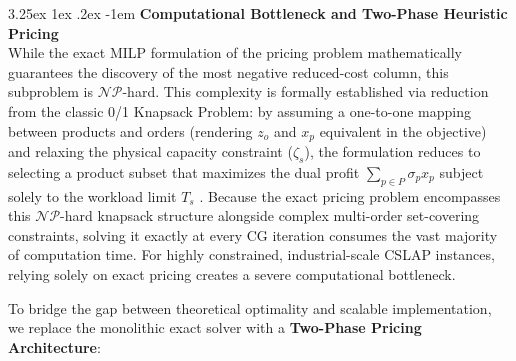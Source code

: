 \documentclass[preprint,review,11pt,authoryear]{elsarticle}
\makeatletter
\renewcommand\paragraph{\@startsection{paragraph}{4}{\z@}
  {3.25ex \@plus1ex \@minus.2ex}
  {-1em}
  {\normalfont\normalsize\itshape}}
\makeatother
\begin{document}
\paragraph{\textbf{Computational Bottleneck and Two-Phase Heuristic Pricing \\}}
\label{sec:cg_enhancements}
While the exact MILP formulation of the pricing problem mathematically guarantees the discovery of the most negative reduced-cost column, this subproblem is $\mathcal{N}\mathcal{P}$-hard. This complexity is formally established via reduction from the classic 0/1 Knapsack Problem: by assuming a one-to-one mapping between products and orders (rendering $z_o$ and $x_p$ equivalent in the objective) and relaxing the physical capacity constraint ($\zeta_s$), the formulation reduces to selecting a product subset that maximizes the dual profit $\sum_{p \in P} \sigma_{p} x_p$ subject solely to the workload limit $T_s$ \citep{garey1979computers}. Because the exact pricing problem encompasses this $\mathcal{N}\mathcal{P}$-hard knapsack structure alongside complex multi-order set-covering constraints, solving it exactly at every CG iteration consumes the vast majority of computation time. For highly constrained, industrial-scale CSLAP instances, relying solely on exact pricing creates a severe computational bottleneck.

To bridge the gap between theoretical optimality and scalable implementation, we replace the monolithic exact solver with a \textbf{Two-Phase Pricing Architecture}:

\end{document}
